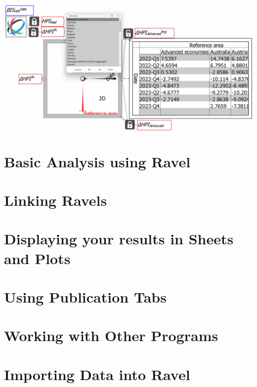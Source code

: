 \includegraphics[width=15cm]{images/tut07SeparatingAdvancedAverage}

\section{Basic Analysis using Ravel}

\section{Linking Ravels}

\section{Displaying your results in Sheets and Plots}

\section{Using Publication Tabs}

\section{Working with Other Programs}

\section{Importing Data into Ravel}

